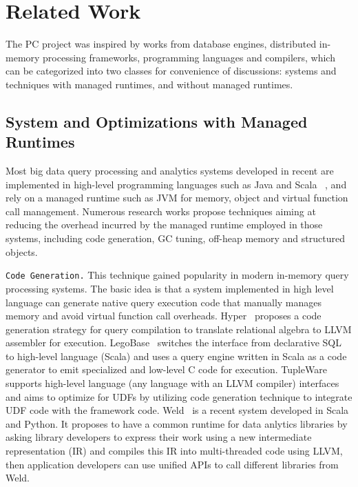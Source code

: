 
\section{Related Work}

The PC project was inspired by works from database engines, distributed in-memory processing
frameworks,  programming languages and compilers, which can be
categorized into two classes for convenience of discussions: systems and techniques with managed
runtimes, and without managed runtimes.


\subsection {System and Optimizations with Managed Runtimes}

Most big data query processing and analytics
systems developed in recent are implemented in
high-level programming languages such as Java and Scala  ~\cite{dean2008mapreduce, yu2008dryadlinq,
  neumann2011efficiently, zaharia2012resilient,
  alexandrov2014stratosphere, klonatos2014building,
  crotty2015tupleware, armbrust2015spark}, and rely on a managed
runtime such as JVM for memory, object and virtual function call management. Numerous research
works propose techniques aiming at
reducing the overhead incurred by the managed runtime employed in
those systems, including code generation, GC tuning, off-heap memory and structured objects.


\vspace{5pt}
\texttt{Code Generation.} This technique gained popularity in modern
in-memory query processing systems. The basic idea is that a system implemented in high level language
can generate native query execution code that manually manages
memory and avoid virtual function call overheads. Hyper~\cite{neumann2011efficiently} proposes a code
generation strategy for query compilation to translate relational
algebra to LLVM assembler for execution.  LegoBase~\cite{klonatos2014building} switches the interface
from declarative SQL to high-level language (Scala) and uses a query engine
written in Scala as a code generator to emit specialized and low-level
C code for execution. TupleWare~\cite{crotty2015tupleware} supports
high-level language (any language with an LLVM compiler) interfaces
and aims to
optimize for UDFs by utilizing code
generation technique to integrate UDF code with the framework
code. 
Weld~\cite{palkar2017weld} is a recent system developed in Scala and
Python. It proposes
to have a common runtime for data anlytics libraries by asking library
developers to express their work using a new intermediate
representation (IR) and compiles this IR into multi-threaded code using
LLVM, then application developers can use unified APIs to
call different libraries from Weld. 

